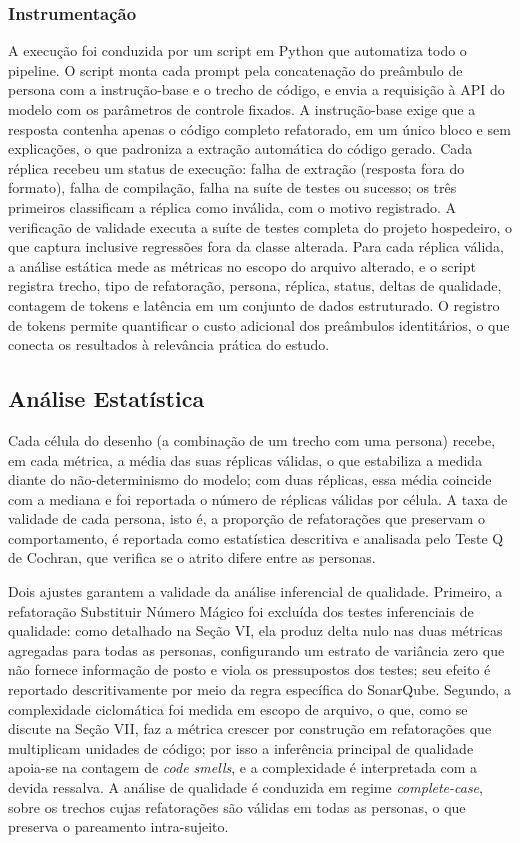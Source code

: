 \documentclass[10pt,conference,a4paper,twocolumn]{article}
\begin{document}
\subsubsection{Instrumentação}
A execução foi conduzida por um script em Python que automatiza todo o pipeline. O script monta cada prompt pela concatenação do preâmbulo de persona com a instrução-base e o trecho de código, e envia a requisição à API do modelo com os parâmetros de controle fixados. A instrução-base exige que a resposta contenha apenas o código completo refatorado, em um único bloco e sem explicações, o que padroniza a extração automática do código gerado. Cada réplica recebeu um status de execução: falha de extração (resposta fora do formato), falha de compilação, falha na suíte de testes ou sucesso; os três primeiros classificam a réplica como inválida, com o motivo registrado. A verificação de validade executa a suíte de testes completa do projeto hospedeiro, o que captura inclusive regressões fora da classe alterada. Para cada réplica válida, a análise estática mede as métricas no escopo do arquivo alterado, e o script registra trecho, tipo de refatoração, persona, réplica, status, deltas de qualidade, contagem de tokens e latência em um conjunto de dados estruturado. O registro de tokens permite quantificar o custo adicional dos preâmbulos identitários, o que conecta os resultados à relevância prática do estudo.

\subsection{Análise Estatística}
Cada célula do desenho (a combinação de um trecho com uma persona) recebe, em cada métrica, a média das suas réplicas válidas, o que estabiliza a medida diante do não-determinismo do modelo; com duas réplicas, essa média coincide com a mediana e foi reportada o número de réplicas válidas por célula. A taxa de validade de cada persona, isto é, a proporção de refatorações que preservam o comportamento, é reportada como estatística descritiva e analisada pelo Teste Q de Cochran, que verifica se o atrito difere entre as personas.

Dois ajustes garantem a validade da análise inferencial de qualidade. Primeiro, a refatoração Substituir Número Mágico foi excluída dos testes inferenciais de qualidade: como detalhado na Seção VI, ela produz delta nulo nas duas métricas agregadas para todas as personas, configurando um estrato de variância zero que não fornece informação de posto e viola os pressupostos dos testes; seu efeito é reportado descritivamente por meio da regra específica do SonarQube. Segundo, a complexidade ciclomática foi medida em escopo de arquivo, o que, como se discute na Seção VII, faz a métrica crescer por construção em refatorações que multiplicam unidades de código; por isso a inferência principal de qualidade apoia-se na contagem de \textit{code smells}, e a complexidade é interpretada com a devida ressalva. A análise de qualidade é conduzida em regime \textit{complete-case}, sobre os trechos cujas refatorações são válidas em todas as personas, o que preserva o pareamento intra-sujeito.
\end{document}
